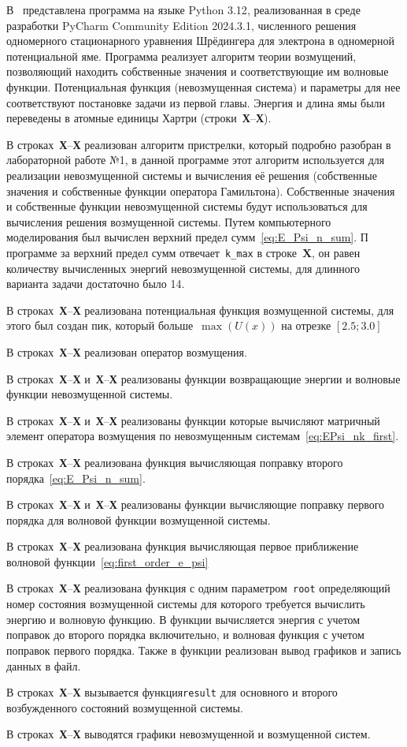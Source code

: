 В~ представлена программа на языке Python 3.12\cite{python},
реализованная в среде разработки PyCharm Community Edition 2024.3.1,
численного решения одномерного стационарного уравнения Шрёдингера для электрона в одномерной потенциальной яме.
Программа реализует алгоритм теории возмущений,
позволяющий находить собственные значения и соответствующие им волновые функции.
Потенциальная функция (невозмущенная система) и параметры для нее соответствуют постановке задачи из первой главы.
Энергия и длина ямы были переведены в атомные единицы Хартри (строки~\textbf{Х}--\textbf{Х}).


В строках~\textbf{Х}--\textbf{Х} реализован алгоритм пристрелки, который подробно разобран в лабораторной работе №1,
в данной программе этот алгоритм используется для реализации невозмущенной системы и вычисления её решения
(собственные значения и собственные функции оператора Гамильтона).
Собственные значения и собственные функции невозмущенной системы будут использоваться для вычисления решения возмущенной системы.
Путем компьютерного моделирования был вычислен верхний предел сумм~\eqref{eq:E_Psi_n_sum}.
П программе за верхний предел сумм отвечает~\lstinline{k_max} в строке~\textbf{X},
он равен количеству вычисленных энергий невозмущенной системы, для длинного варианта задачи достаточно было 14.


В строках~\textbf{Х}--\textbf{Х} реализована потенциальная функция возмущенной системы, для этого был создан пик, который больше~$\max(U(x))$ на отрезке $\left[ 2.5; 3.0 \right]$


В строках~\textbf{Х}--\textbf{Х} реализован оператор возмущения.


В строках~\textbf{Х}--\textbf{Х} и~\textbf{Х}--\textbf{Х} реализованы функции возвращающие энергии и волновые функции невозмущенной системы.


В строках~\textbf{Х}--\textbf{Х} и~\textbf{Х}--\textbf{Х} реализованы функции которые вычисляют матричный элемент оператора возмущения по невозмущенным системам~\eqref{eq:EPsi_nk_first}.


В строках~\textbf{Х}--\textbf{Х} реализована функция вычисляющая поправку второго порядка~\eqref{eq:E_Psi_n_sum}.


В строках~\textbf{Х}--\textbf{Х} и~\textbf{Х}--\textbf{Х} реализованы функции вычисляющие поправку первого порядка для волновой функции возмущенной системы.


В строках~\textbf{Х}--\textbf{Х} реализована функция вычисляющая первое приближение волновой функции~\eqref{eq:first_order_e_psi}


В строках~\textbf{Х}--\textbf{Х} реализована функция с одним параметром~\lstinline{root} определяющий номер состояния возмущенной системы для которого требуется вычислить энергию и волновую функцию.
В функции вычисляется энергия с учетом поправок до второго порядка включительно, и волновая функция с учетом поправок первого порядка.
Также в функции реализован вывод графиков и запись данных в файл.


В строках~\textbf{Х}--\textbf{Х} вызывается функция\lstinline{result} для основного и второго возбужденного состояний возмущенной системы.


В строках~\textbf{Х}--\textbf{Х} выводятся графики невозмущенной и возмущенной систем.